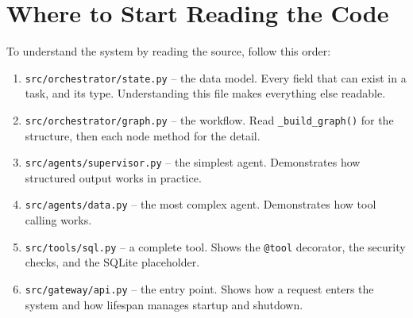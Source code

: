 \documentclass[12pt,a4paper]{article}
\begin{document}
\section{Where to Start Reading the Code}

To understand the system by reading the source, follow this order:

\begin{enumerate}
  \item \texttt{src/orchestrator/state.py} -- the data model. Every field that can exist in a task, and its type. Understanding this file makes everything else readable.
  \item \texttt{src/orchestrator/graph.py} -- the workflow. Read \texttt{\_build\_graph()} for the structure, then each node method for the detail.
  \item \texttt{src/agents/supervisor.py} -- the simplest agent. Demonstrates how structured output works in practice.
  \item \texttt{src/agents/data.py} -- the most complex agent. Demonstrates how tool calling works.
  \item \texttt{src/tools/sql.py} -- a complete tool. Shows the \texttt{@tool} decorator, the security checks, and the SQLite placeholder.
  \item \texttt{src/gateway/api.py} -- the entry point. Shows how a request enters the system and how lifespan manages startup and shutdown.
\end{enumerate}
\end{document}
